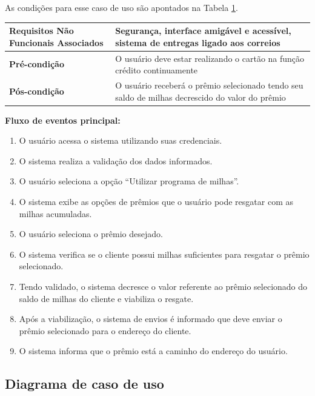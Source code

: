 As condições para esse caso de uso são apontados na Tabela \ref{tab:milhas}.

\begin{table}[h]
  \centering
  \begin{tabular}{|p{4cm} | p{10cm} |}
      \hline
      \small{\textbf{Requisitos Não Funcionais Associados}}	& Segurança, interface amigável e acessível, sistema de entregas ligado aos correios	\\ \hline
      \small{\textbf{Pré-condição}}	&	O usuário deve estar realizando o cartão na função crédito continuamente	\\ \hline
      \small{\textbf{Pós-condição}}	&	O usuário receberá o prêmio selecionado tendo seu saldo de milhas decrescido do valor do prêmio	\\ \hline
    \end{tabular}
 \label{tab:milhas}
\end{table}

\textbf{Fluxo de eventos principal:}

\begin{enumerate}
  \item O usuário acessa o sistema utilizando suas credenciais.
  \item O sistema realiza a validação dos dados informados.
  \item O usuário seleciona a opção ``Utilizar programa de milhas''.
  \item O sistema exibe as opções de prêmios que o usuário pode resgatar com as milhas acumuladas.
  \item O usuário seleciona o prêmio desejado.
  \item O sistema verifica se o cliente possui milhas suficientes para resgatar o prêmio selecionado.
  \item Tendo validado, o sistema decresce o valor referente ao prêmio selecionado do saldo de milhas do cliente e viabiliza o resgate.
  \item Após a viabilização, o sistema de envios é informado que deve enviar o prêmio selecionado para o endereço do cliente.
  \item O sistema informa que o prêmio está a caminho do endereço do usuário.
\end{enumerate}

\subsection{Diagrama de caso de uso}

